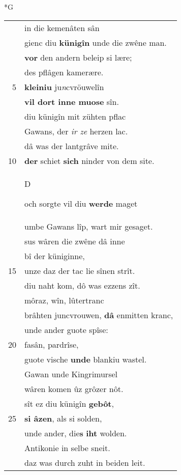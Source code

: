 \documentclass[8pt,a4paper,notitlepage]{article}
\begin{document}
\begin{table}[ht]
\begin{minipage}[t]{0.5\linewidth}
\small
\begin{center}*G
\end{center}
\begin{tabular}{rl}
 & in die kemenâten sân\\ 
 & gienc diu \textbf{künigîn} unde die zwêne man.\\ 
 & \textbf{vor} den andern beleip si lære;\\ 
 & des pflâgen kamerære.\\ 
5 & \textbf{kleiniu} ju\textit{n}cvröuwelîn\\ 
 & \textbf{vil dort inne muose} sîn.\\ 
 & diu künigîn mit zühten pflac\\ 
 & Gawans, der \textit{ir ze} herzen lac.\\ 
 & dâ was der lantgrâve mite.\\ 
10 & \textbf{der} schiet \textbf{sich} ninder von dem site.\\ 
 & \begin{large}D\end{large}och sorgte vil diu \textbf{werde} maget\\ 
 & umbe Gawans lîp, wart mir gesaget.\\ 
 & sus wâren die zwêne dâ inne\\ 
 & bî der küniginne,\\ 
15 & unze daz der tac lie sînen strît.\\ 
 & diu naht kom, dô was ezzens zît.\\ 
 & môraz, wîn, lûtertranc\\ 
 & brâhten juncvrouwen, \textbf{dâ} enmitten kranc,\\ 
 & unde ander guote spîse:\\ 
20 & fasân, pardrîse,\\ 
 & guote vische \textbf{unde} blankiu wastel.\\ 
 & Gawan unde Kingrimursel\\ 
 & wâren komen ûz grôzer nôt.\\ 
 & sît ez diu künigîn \textbf{gebôt},\\ 
25 & \textbf{si âzen}, als si solden,\\ 
 & unde ander, die\textbf{s} \textbf{iht} wolden.\\ 
 & Antikonie in selbe sneit.\\ 
 & daz was durch zuht in beiden leit.\\ 

\end{tabular}
\end{minipage}
\end{table}
\end{document}
